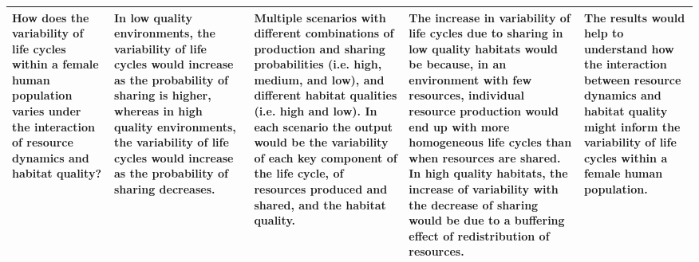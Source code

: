 \documentclass{article}
\begin{document}
\begin{table}[H]
\begin{adjustbox}{width=\textwidth}
\begin{tabular}{p{4cm}p{4cm}p{4cm}p{4cm}p{4cm} }
    How does the variability of life cycles within a female human population varies under the interaction of resource dynamics and habitat quality? & In low quality environments, the variability of life cycles would increase as the probability of sharing is higher, whereas in high quality environments, the variability of life cycles would increase as the probability of sharing decreases. & Multiple scenarios with different combinations of production and sharing probabilities (i.e. high, medium, and low), and different habitat qualities (i.e. high and low). In each scenario the output would be the variability of each key component of the life cycle, of resources produced and shared, and the habitat quality. & The increase in variability of life cycles due to sharing in low quality habitats would be because, in an environment with few resources, individual resource production would end up with more homogeneous life cycles than when resources are shared. In high quality habitats, the increase of variability with the decrease of sharing would be due to a buffering effect of redistribution of resources. & The results would help to understand how the interaction between resource dynamics and habitat quality might inform the variability of life cycles within a female human population.\\
    \hline
    \end{tabular}
    \end{adjustbox}
    \label{tab:1}
\end{table}
\end{document}
